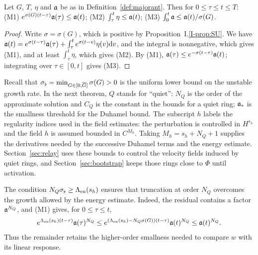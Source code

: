 \begin{lemma}
\label{lem:majorant}
Let $G$, $T$, $\eta$ and $\mathfrak{a}$ be as in Definition~\ref{def:majorant}. Then for
$0\le\tau\le t\le T$:
\textup{(M1)} $e^{\sigma(G)(t-\tau)}\mathfrak{a}(\tau)\le\mathfrak{a}(t)$;
\textup{(M2)} $\int_\tau^t\eta\le\mathfrak{a}(t)$;
\textup{(M3)} $\int_0^t\mathfrak{a}\le\mathfrak{a}(t)/\sigma(G)$.
\end{lemma}
\begin{proof}
Write $\sigma=\sigma(G)$, which is positive by Proposition~I.\ref{I-prop:SU}. We have
$\mathfrak{a}(t)=e^{\sigma(t-\tau)}\mathfrak{a}(\tau)+\int_\tau^te^{\sigma(t-v)}\eta(v)\dd v$, and the
integral is nonnegative, which gives (M1), and at least $\int_\tau^t\eta$, which
gives (M2). By (M1), $\mathfrak{a}(\tau)\le e^{-\sigma(t-\tau)}\mathfrak{a}(t)$; integrating over
$\tau\in[0,t]$ gives (M3).
\end{proof}

Recall that $\sigma_\flat=\min_{G\in[0,\overline{G}]}\sigma(G)>0$ is the uniform lower
bound on the unstable growth rate. In the next theorem, $Q$ stands for
``quiet'': $N_Q$ is the order of the approximate solution and $C_Q$ is the
constant in the bounds for a quiet ring; $\mathfrak{a}_*$ is the smallness threshold for the
Duhamel bound. The subscript $h$ labels the regularity indices used in the
field estimates: the perturbation is controlled in $H^{s_h}$ and the field
$h$ is assumed bounded in $C^{M_h}$. Taking $M_h=s_h+N_Q+1$ supplies the derivatives needed
by the successive Duhamel terms and the energy estimate. Section~\ref{sec:relay}
uses these bounds to control the velocity fields induced by quiet rings,
and Section~\ref{sec:bootstrap} keeps those rings close to $\Phi$ until activation.

The condition $N_Q\sigma_\flat\ge\Lambda_{\mathrm{en}}(s_h)$ ensures that truncation at order $N_Q$
overcomes the growth allowed by the energy estimate. Indeed, the residual
contains a factor $\mathfrak{a}^{N_Q}$, and (M1) gives, for $0\le\tau\le t$,
\[
e^{\Lambda_{\mathrm{en}}(s_h)(t-\tau)}\mathfrak{a}(\tau)^{N_Q}
\le e^{(\Lambda_{\mathrm{en}}(s_h)-N_Q\sigma(G))(t-\tau)}\mathfrak{a}(t)^{N_Q}
\le\mathfrak{a}(t)^{N_Q}.
\]
Thus the remainder retains the higher-order smallness needed to compare
$w$ with its linear response.

